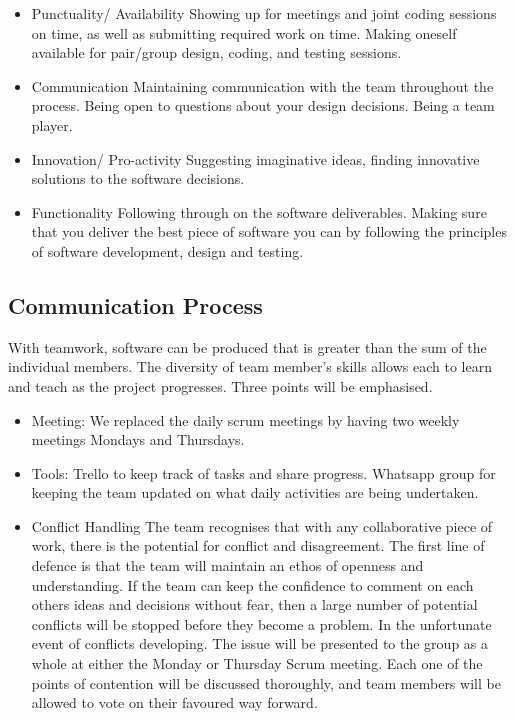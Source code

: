 \documentclass[11pt]{article}
\begin{document}
\begin{itemize}
	\item Punctuality/ Availability
	\subitem Showing up for meetings and joint coding sessions on time, as well as submitting required work on time.
	Making oneself available for pair/group design, coding, and testing sessions.
	
	\item Communication
	\subitem Maintaining communication with the team throughout the process. Being open to questions about your design decisions. Being a team player.
	
	\item Innovation/ Pro-activity
	\subitem Suggesting imaginative ideas, finding innovative solutions to the software decisions.
	
	\item Functionality
	\subitem Following through on the software deliverables. Making sure that you deliver the best piece of software you can by following the principles of software development, design and testing.
\end{itemize}


 \subsection{Communication Process}
With teamwork, software can be produced that is greater than the sum of the individual members. The diversity of team member's skills allows each to learn and teach as the project progresses. Three points will be emphasised.
  \begin{itemize}
  	\item Meeting: We replaced the daily scrum meetings by having two weekly meetings Mondays and Thursdays.
 	\item Tools: Trello to keep track of tasks and share progress. Whatsapp group for keeping the team updated on what daily activities are being undertaken.
  	\item Conflict Handling
		 \subitem The team recognises that with any collaborative piece of work, there is the potential for conflict and disagreement. The first line of defence is that the team will maintain an ethos of openness and understanding. If the team can keep the confidence to comment on each others ideas and decisions without fear, then a large number of potential conflicts will be stopped before they become a problem.
		 \subitem In the unfortunate event of conflicts developing. The issue will be presented to the group as a whole at either the Monday or Thursday Scrum meeting. Each one of the points of contention will be discussed thoroughly, and team members will be allowed to vote on their favoured way forward.
  \end{itemize}
\end{document}

